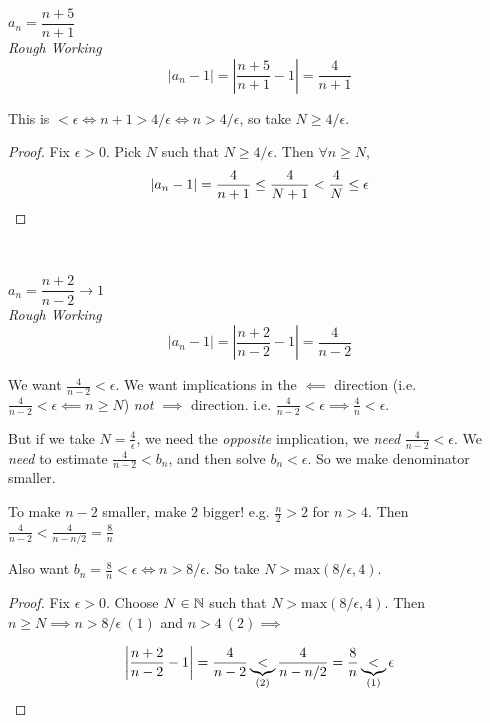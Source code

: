 \documentclass[twoside]{scrartcl}
\begin{document}
\begin{example}
$a_n = \dfrac{n+5}{n+1}$\\

\emph{Rough Working}
\[ |a_n - 1| = \left| \dfrac{n+5}{n+1} -1 \right| = \dfrac{4}{n+1}\]

This is $< \epsilon \iff n+1 > 4/\epsilon \iff n > 4/\epsilon$, so take $N \geq 4/\epsilon$. 

\begin{proof}
Fix $\epsilon > 0$. Pick $N$ such that $N \geq 4/\epsilon$. Then $\forall n \geq N$, \[|a_n - 1| = \frac{4}{n+1} \leq \frac{4}{N+1} < \frac{4}{N} \leq \epsilon\qedhere\]
\end{proof}
\end{example}~

\begin{example}$a_n = \dfrac{n+2}{n-2} \to 1$\\

\emph{Rough Working} 
\[|a_n -1| = \left|\frac{n+2}{n-2} - 1\right| = \frac{4}{n-2}\]

We want $\frac{4}{n-2} < \epsilon$. We want implications in the $\impliedby$ direction (i.e. $\frac{4}{n-2} < \epsilon \impliedby n \geq N$) \emph{not} $\implies$ direction. i.e. $\frac{4}{n-2} < \epsilon \implies \frac{4}{n} < \epsilon$.

But if we take $N = \frac{4}{\epsilon}$, we need the \emph{opposite} implication, we \emph{need} $\frac{4}{n-2} < \epsilon$. We \emph{need} to estimate $\frac{4}{n-2} < b_n$, and then solve $b_n < \epsilon$. So we make denominator smaller. 

To make $n-2$ smaller, make $2$ bigger! e.g. $\frac{n}{2}>2$ for $n>4$. Then $\frac{4}{n-2} < \frac{4}{n-n/2} = \frac{8}{n}$

Also want $b_n = \frac{8}{n} < \epsilon \iff n > 8/\epsilon$. So take $N > \mathrm{max}(8/\epsilon, 4)$.

\begin{proof}
Fix $\epsilon > 0.$	Choose $N \in\mathbb{N}$ such that $N > \mathrm{max}(8/\epsilon, 4)$. Then $n \geq N \implies n > 8/\epsilon~ (1)$ and $n > 4 ~(2) \implies$

\[\left|\frac{n+2}{n-2} - 1\right| = \frac{4}{n-2} \underbrace{<}_{(2)} \frac{4}{n-n/2} = \frac{8}{n} \underbrace{<}_{(1)} \epsilon\qedhere\]

\end{proof}

	
\end{example}
\pagebreak
\end{document}
